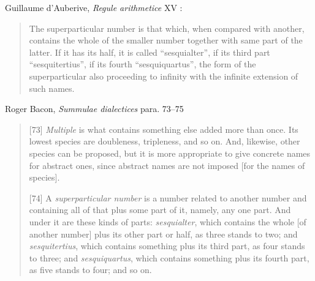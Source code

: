 \documentclass{article}
\theoremstyle{definition}
\begin{document}
Guillaume d'Auberive, {\em Regule arithmetice} XV \cite[p.~109]{gersh}:

\begin{quote}
The superparticular number is that which, when compared with
another, contains the whole of the smaller number together with same part
of the latter. If it has its half, it is called ``sesquialter'', if its third part ``sesquitertius'',
if its fourth ``sesquiquartus'', the form of the superparticular
also proceeding to infinity with the infinite extension of such names.
\end{quote}

Roger Bacon, {\em Summulae dialectices} para. 73--75 \cite[pp.~43--44]{MST47}

\begin{quote}
[73] {\em Multiple} is what contains something else added more than once. Its lowest species are doubleness, tripleness, and so on. And, likewise, other species can be proposed, but it is more appropriate to give concrete names for abstract ones, since abstract names are not imposed [for the names of species].

[74] A {\em superparticular number} is a number related to another number and containing all of that plus some part of it, namely, any one part.
And under it are these kinds of parts: {\em sesquialter}, which contains the whole [of another number] plus its other part or half, as three stands to two; and {\em sesquitertius}, which contains something plus its third part, as four stands to three; and {\em sesquiquartus}, which contains something plus its fourth part, as five stands to four; and so on.


\end{quote}
\end{document}
